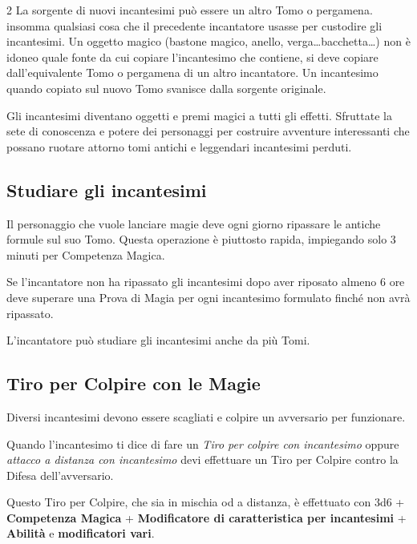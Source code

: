 \begin{multicols}{2}
La sorgente di nuovi incantesimi può essere un altro Tomo o pergamena. insomma qualsiasi cosa che il precedente incantatore usasse per custodire gli incantesimi. Un oggetto magico (bastone magico, anello, verga…bacchetta…) non è idoneo quale fonte da cui copiare l'incantesimo che contiene, si deve copiare dall'equivalente Tomo o pergamena di un altro incantatore. Un incantesimo quando copiato sul nuovo Tomo svanisce dalla sorgente originale.

\begin{narratore}
Gli incantesimi diventano oggetti e premi magici a tutti gli effetti. Sfruttate la sete di conoscenza e potere dei personaggi per costruire avventure interessanti che possano ruotare attorno tomi antichi e leggendari incantesimi perduti.
\end{narratore}

\subsection{Studiare gli incantesimi}\label{magiestudiareincantesimi}

Il personaggio che vuole lanciare magie deve ogni giorno ripassare le antiche formule sul suo Tomo. Questa operazione è piuttosto rapida, impiegando solo 3 minuti per Competenza Magica.

Se l'incantatore non ha ripassato gli incantesimi dopo aver riposato almeno 6 ore deve superare una Prova di Magia per ogni incantesimo formulato finché non avrà ripassato.

L'incantatore può studiare gli incantesimi anche da più Tomi.

\subsection{Tiro per Colpire con le Magie}\label{magietiropercolpireconlemagie}\hypertarget{magietiropercolpireconlemagie}{}

Diversi incantesimi devono essere scagliati e colpire un avversario per funzionare.

Quando l'incantesimo ti dice di fare un \emph{Tiro per colpire con incantesimo} oppure \emph{attacco a distanza con incantesimo} devi effettuare un Tiro per Colpire contro la Difesa dell'avversario.

Questo Tiro per Colpire, che sia in mischia od a distanza, è effettuato con 3d6 + \textbf{Competenza Magica} + \textbf{Modificatore di caratteristica per incantesimi} + \textbf{Abilità} e \textbf{modificatori vari}.


\end{multicols}
